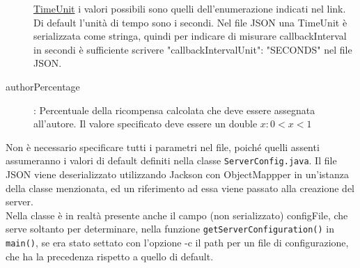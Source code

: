 \begin{description}
	\hyperref{https://docs.oracle.com/en/java/javase/11/docs/api/java.base/java/util/concurrent/TimeUnit.html#enum.constant.summary}{category}{name}{TimeUnit} i valori possibili sono quelli dell'enumerazione indicati nel link. Di default l'unità di tempo sono i secondi. Nel file JSON una TimeUnit è serializzata come stringa, quindi per indicare di misurare callbackInterval in secondi è sufficiente scrivere
	"callbackIntervalUnit": "SECONDS" nel file JSON.
	\item[authorPercentage]: Percentuale della ricompensa calcolata che deve essere assegnata all'autore. 
	Il valore specificato deve essere un double $x : 0 < x < 1$
\end{description}
Non è necessario specificare tutti i parametri nel file, poiché quelli assenti assumeranno i valori di default definiti nella classe \verb|ServerConfig.java|. Il file JSON viene deserializzato utilizzando Jackson con ObjectMappper in un'istanza della classe menzionata, ed un riferimento ad essa viene passato alla creazione del server.\\
Nella classe è in realtà presente anche il campo (non serializzato) configFile, che serve soltanto per determinare, nella funzione \verb|getServerConfiguration()| in \verb|main()|, se era stato settato con l'opzione -c il path per un file di configurazione, che ha la precedenza rispetto a quello di default.

